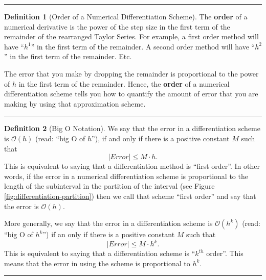 \documentclass[
]{book}
\theoremstyle{definition}
\newtheorem{definition}{Definition}[chapter]
\theoremstyle{definition}
\theoremstyle{definition}
\theoremstyle{remark}
\begin{document}
\begin{center}\rule{0.5\linewidth}{0.5pt}\end{center}

\begin{definition}[Order of a Numerical Differentiation Scheme]
\protect\hypertarget{def:unnamed-chunk-145}{}{\label{def:unnamed-chunk-145} {} }The \textbf{order} of a numerical derivative is the power of the step size in
the first term of the remainder of the rearranged Taylor Series. For example, a first order method will have ``\(h^1\)'' in the first term of the remainder. A second order method will have ``\(h^2\)'' in the first term of the remainder. Etc.

The error that you make by dropping the remainder is proportional to the power of \(h\) in the first term of the remainder. Hence, the \textbf{order} of a numerical differentiation scheme tells you how to quantify the amount of error that you are making by using that approximation scheme.
\end{definition}

\begin{center}\rule{0.5\linewidth}{0.5pt}\end{center}

\begin{definition}[Big O Notation]
\protect\hypertarget{def:unnamed-chunk-146}{}{\label{def:unnamed-chunk-146} {} }We say that the error in a differentiation scheme is \(\mathcal{O}(h)\) (read: ``big O of \(h\)''),
if and only if there is a positive constant \(M\) such that
\[ |Error| \le M \cdot h.\]
This is equivalent to saying that a differentiation method is ``first order''. In other words, if the error in a numerical differentiation scheme is proportional to the length of the subinterval in the partition of the interval (see Figure \ref{fig:differentiation-partition}) then we call that scheme ``first order'' and say that the error is \(\mathcal{O}(h)\).

More generally, we say that the error in a differentiation scheme is \(\mathcal{O}(h^k)\) (read: ``big O of \(h^k\)'') if an only if there is a positive constant \(M\) such that
\[ |Error| \leq M \cdot h^k. \]
This is equivalent to saying that a differentiation scheme is ``\(k^{th}\) order''. This means that the error in using the scheme is proportional to \(h^k\).
\end{definition}

\begin{center}\rule{0.5\linewidth}{0.5pt}\end{center}
\end{document}
